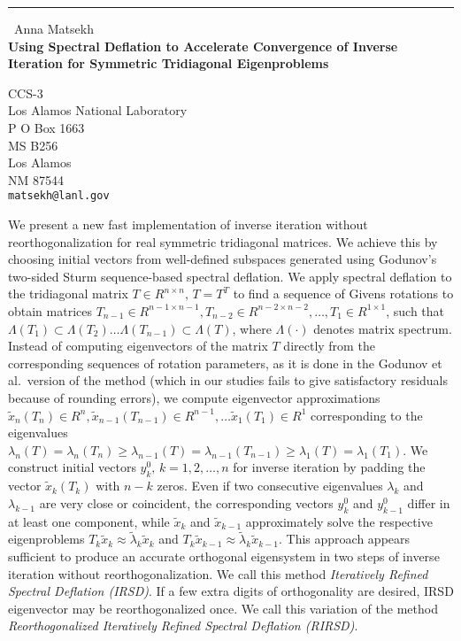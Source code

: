 \documentclass{report}
\begin{document}
\begin{center}
\rule{6in}{1pt} \
{\large Anna Matsekh \\
{\bf Using Spectral Deflation to Accelerate Convergence of Inverse Iteration for Symmetric Tridiagonal Eigenproblems}}

CCS-3 \\ Los Alamos National Laboratory \\ P O Box 1663 \\ MS B256 \\ Los Alamos \\ NM 87544
\\
{\tt matsekh@lanl.gov}\end{center}

We present a new fast implementation of inverse iteration without
reorthogonalization for real symmetric tridiagonal matrices.
We achieve this by choosing initial vectors from well-defined
subspaces generated using Godunov's two-sided Sturm sequence-based spectral
deflation. We apply spectral deflation to the
tridiagonal matrix $T \in R^{n\times n},\, T = T^T$ to find a
sequence of Givens rotations to obtain matrices $T_{n-1} \in R^{n-1 \times
n-1}, T_{n-2} \in R^{n-2 \times n-2},\ldots, T_{1} \in R^{1\times
1}$, such that $\Lambda(T_{1}) \subset \Lambda(T_{2})\ldots
\Lambda(T_{n-1}) \subset \Lambda(T)$, where $\Lambda(\cdot)$
denotes matrix spectrum. Instead of computing eigenvectors
of the matrix $T$ directly from the corresponding sequences of
rotation parameters, as it is done in the Godunov et al.\
version of the method (which in our studies fails to give
satisfactory residuals because of rounding errors), we compute
eigenvector approximations $\tilde{x}_n(T_n) \in R^{n},
\tilde{x}_{n-1}(T_{n-1}) \in R^{n-1}, \ldots \tilde{x}_1(T_1) \in
R^{1}$ corresponding to the eigenvalues
$\lambda_n(T)=\lambda_n(T_n) \geq
\lambda_{n-1}(T)=\lambda_{n-1}(T_{n-1}) \geq
\lambda_1(T)=\lambda_1(T_1)$. We construct initial vectors
${y^0_k},\, k = 1, 2, \ldots, n$ for inverse iteration by padding
the vector $\tilde{x}_k(T_{k})$ with $n-k$ zeros. Even if two
consecutive eigenvalues $\lambda_k$ and $\lambda_{k-1}$ are very
close or coincident, the corresponding vectors ${y^0_k}$ and
${y^0_{k-1}}$ differ in at least one component, while
$\tilde{x}_k$ and $\tilde{x}_{k-1}$ approximately solve the
respective eigenproblems $T_{k} \tilde{x}_{k} \approx
\tilde{\lambda}_{k} \tilde{x}_k$ and $T_{k} \tilde{x}_{k-1}
\approx \tilde{\lambda}_{k} \tilde{x}_{k-1}$. This approach appears
sufficient to produce an accurate orthogonal eigensystem
in two steps of inverse iteration without reorthogonalization. We
call this method \emph{Iteratively Refined Spectral Deflation (IRSD)}.
If a few extra digits of orthogonality are desired, IRSD eigenvector
may be reorthogonalized once. We call this variation of the method
\emph{Reorthogonalized Iteratively Refined Spectral Deflation (RIRSD)}.
\end{document}
